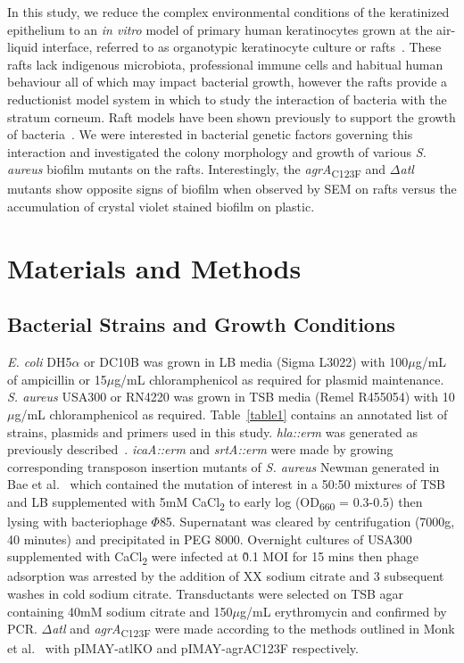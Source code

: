 \documentclass[10pt,letterpaper]{article}
\begin{document}
In this study, we reduce the complex environmental conditions of the keratinized epithelium to an \textit{in vitro} model of primary human keratinocytes grown at the air-liquid interface, referred to as organotypic keratinocyte culture or rafts~\cite{simpson_rna_2010}.
These rafts lack indigenous microbiota, professional immune cells and habitual human behaviour all of which may impact bacterial growth, however the rafts provide a reductionist model system in which to study the interaction of bacteria with the stratum corneum.
Raft models have been shown previously to support the growth of bacteria~\cite{breij_three-dimensional_2012, holland_microbial_2008, reijer_detection_2016}.
We were interested in bacterial genetic factors governing this interaction and investigated the colony morphology and growth of various \textit{S. aureus} biofilm mutants on the rafts.
Interestingly, the \textit{agrA}\textsubscript{C123F} and $\Delta$\textit{atl} mutants show opposite signs of biofilm when observed by SEM on rafts versus the accumulation of crystal violet stained biofilm on plastic.

\section*{Materials and Methods}

\subsection*{Bacterial Strains and Growth Conditions}
\textit{E. coli} DH5$\alpha$ or DC10B was grown in LB media (Sigma L3022) with 100$\mu$g/mL of ampicillin or 15$\mu$g/mL chloramphenicol as required for plasmid maintenance.
\textit{S. aureus} USA300 or RN4220 was grown in TSB media (Remel R455054) with 10$\mu$g/mL chloramphenicol as required.
Table~\ref{table1} contains an annotated list of strains, plasmids and primers used in this study.
\textit{hla::erm} was generated as previously described~\cite{bubeck_wardenburg_poring_2007}.
\textit{icaA::erm} and \textit{srtA::erm} were made by growing corresponding transposon insertion mutants of \textit{S. aureus} Newman generated in Bae et al.~\cite{bae_staphylococcus_2004} which contained the mutation of interest in a 50:50 mixtures of TSB and LB supplemented with 5mM CaCl\textsubscript{2} to early log (OD\textsubscript{660} = 0.3-0.5) then lysing with bacteriophage $\Phi$85.
Supernatant was cleared by centrifugation (7000g, 40 minutes) and precipitated in PEG 8000.
Overnight cultures of USA300 supplemented with CaCl\textsubscript{2} were infected at \~0.1 MOI for 15 mins then phage adsorption was arrested by the addition of XX sodium citrate and 3 subsequent washes in cold sodium citrate.
Transductants were selected on TSB agar containing 40mM sodium citrate and 150$\mu$g/mL erythromycin and confirmed by PCR.
$\Delta$\textit{atl} and \textit{agrA}\textsubscript{C123F} were made according to the methods outlined in Monk et al.~\cite{monk_transforming_2012} with pIMAY-atlKO and pIMAY-agrAC123F respectively.
\end{document}
